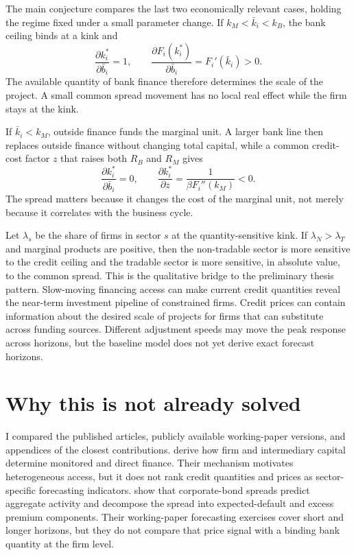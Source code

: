 \documentclass[11pt]{article}
\newcommand{\kb}{k_B}
\newcommand{\km}{k_M}
\newcommand{\Rb}{R_B}
\newcommand{\Rm}{R_M}
\begin{document}
The main conjecture compares the last two economically relevant cases, holding
the regime fixed under a small parameter change. If
$\km<\bar k_i<\kb$, the bank ceiling binds at a kink and
\[
 \frac{\partial k_i^*}{\partial\bar b_i}=1,
 \qquad
 \frac{\partial F_i(k_i^*)}{\partial\bar b_i}=F_i'(\bar k_i)>0.
\]
The available quantity of bank finance therefore determines the scale of the
project. A small common spread movement has no local real effect while the firm
stays at the kink.

If $\bar k_i<\km$, outside finance funds the marginal unit. A larger bank line
then replaces outside finance without changing total capital, while a common
credit-cost factor $z$ that raises both $\Rb$ and $\Rm$ gives
\[
 \frac{\partial k_i^*}{\partial\bar b_i}=0,
 \qquad
 \frac{\partial k_i^*}{\partial z}
 =\frac{1}{\beta F_i''(\km)}<0.
\]
The spread matters because it changes the cost of the marginal unit, not merely
because it correlates with the business cycle.

Let $\lambda_s$ be the share of firms in sector $s$ at the quantity-sensitive
kink. If $\lambda_N>\lambda_T$ and marginal products are positive, then the
non-tradable sector is more sensitive to the credit ceiling and the tradable
sector is more sensitive, in absolute value, to the common spread. This is the
qualitative bridge to the preliminary thesis pattern. Slow-moving financing
access can make current credit quantities reveal the near-term investment
pipeline of constrained firms. Credit prices can contain information about the
desired scale of projects for firms that can substitute across funding sources.
Different adjustment speeds may move the peak response across horizons, but the
baseline model does not yet derive exact forecast horizons.

\section{Why this is not already solved}

I compared the published articles, publicly available working-paper versions,
and appendices of the closest contributions. \citet{holmstromtirole1997}
derive how firm and intermediary capital determine monitored and direct
finance. Their mechanism motivates heterogeneous access, but it does not rank
credit quantities and prices as sector-specific forecasting indicators.
\citet{gilchristzakrajsek2012} show that corporate-bond spreads predict
aggregate activity and decompose the spread into expected-default and excess
premium components. Their working-paper forecasting exercises cover short and
longer horizons, but they do not compare that price signal with a binding bank
quantity at the firm level.
\end{document}
